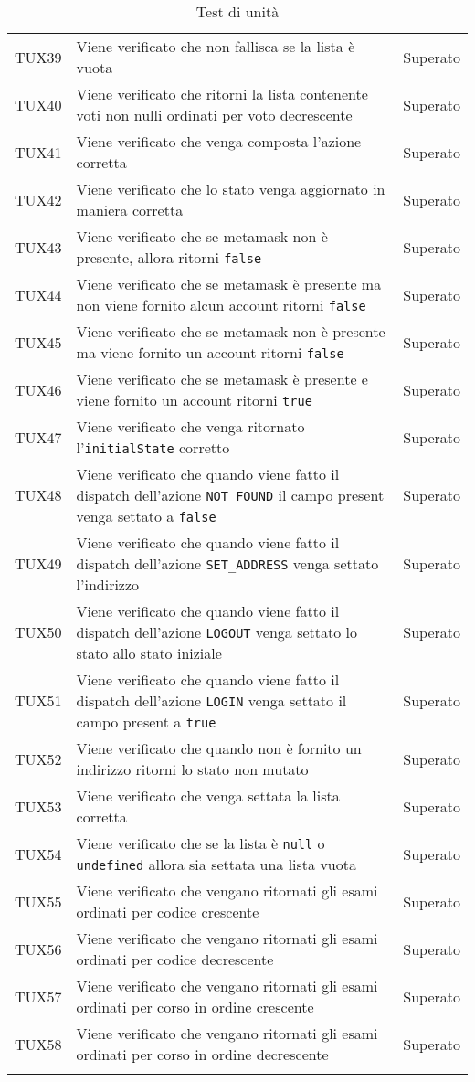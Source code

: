 \documentclass[PianoDiQualifica.tex]{subfiles}
\begin{document}
\begin{longtable}[H]{P{2cm}P{8.5cm}P{3cm}}
	TUX39 & Viene verificato che non fallisca se la lista è vuota & Superato \\
	TUX40 & Viene verificato che ritorni la lista contenente voti non nulli ordinati per voto decrescente & Superato \\
	TUX41 & Viene verificato che venga composta l'azione corretta & Superato \\
	TUX42 & Viene verificato che lo stato venga aggiornato in maniera corretta & Superato \\
	TUX43 & Viene verificato che se metamask non è presente, allora ritorni \texttt{false} & Superato \\
	TUX44 & Viene verificato che se metamask è presente ma non viene fornito alcun account ritorni \texttt{false} & Superato \\
	TUX45 & Viene verificato che se metamask non è presente ma viene fornito un account ritorni \texttt{false} & Superato \\
	TUX46 & Viene verificato che se metamask è presente e viene fornito un account ritorni \texttt{true} & Superato \\
	TUX47 & Viene verificato che venga ritornato l'\texttt{initialState} corretto & Superato \\
	TUX48 & Viene verificato che quando viene fatto il dispatch dell'azione \texttt{NOT\_FOUND} il campo present venga settato a \texttt{false}  & Superato \\
	TUX49 & Viene verificato che quando viene fatto il dispatch dell'azione \texttt{SET\_ADDRESS} venga settato l'indirizzo & Superato \\
	TUX50 & Viene verificato che quando viene fatto il dispatch dell'azione \texttt{LOGOUT} venga settato lo stato allo stato iniziale & Superato \\
	TUX51 & Viene verificato che quando viene fatto il dispatch dell'azione \texttt{LOGIN} venga settato il campo present a \texttt{true} & Superato \\
	TUX52 & Viene verificato che quando non è fornito un indirizzo ritorni lo stato non mutato & Superato \\
	TUX53 & Viene verificato che venga settata la lista corretta & Superato \\
	TUX54 & Viene verificato che se la lista è \texttt{null} o \texttt{undefined} allora sia settata una lista vuota & Superato \\
	TUX55 & Viene verificato che vengano ritornati gli esami ordinati per codice crescente & Superato \\
	TUX56 & Viene verificato che vengano ritornati gli esami ordinati per codice decrescente & Superato \\
	TUX57 & Viene verificato che vengano ritornati gli esami ordinati per corso in ordine crescente & Superato \\
	TUX58 & Viene verificato che vengano ritornati gli esami ordinati per corso in ordine decrescente & Superato \\
	
	\hiderowcolors
	\caption{Test di unità}
\end{longtable}
\end{document}
